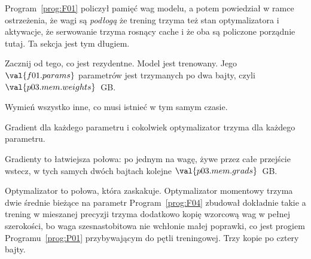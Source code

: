 \begin{fr}
Program~\ref{prog:F01} policzył pamięć wag modelu, a potem powiedział w ramce
ostrzeżenia, że wagi są \emph{podłogą} \dash{} że trening trzyma też stan
optymalizatora i aktywacje, że serwowanie trzyma rosnący cache i że oba są
policzone porządnie tutaj. Ta sekcja jest tym długiem.

Zacznij od tego, co jest rezydentne. Model jest trenowany. Jego
$\val{f01.params}$ parametrów jest trzymanych po dwa bajty, czyli
$\val{p03.mem.weights}$~GB.

Wymień wszystko inne, co musi istnieć w tym samym czasie.
\nextframe
\end{fr}

\begin{fr}
\begin{ansblock}
Gradient dla każdego parametru i cokolwiek optymalizator trzyma dla każdego
parametru.
\end{ansblock}

Gradienty to łatwiejsza połowa: po jednym na wagę, żywe przez całe przejście
wstecz, w tych samych dwóch bajtach \dash{} kolejne
$\val{p03.mem.grads}$~GB.

Optymalizator to połowa, która zaskakuje. Optymalizator momentowy trzyma dwie
średnie bieżące na parametr \dash{} Program~\ref{prog:F04} zbudował dokładnie
takie \dash{} a trening w mieszanej precyzji trzyma dodatkowo kopię wzorcową
wag w pełnej szerokości, bo waga szesnastobitowa nie wchłonie małej poprawki,
co jest progiem Programu~\ref{prog:P01} przybywającym do pętli treningowej.
Trzy kopie po cztery bajty.
\end{fr}


